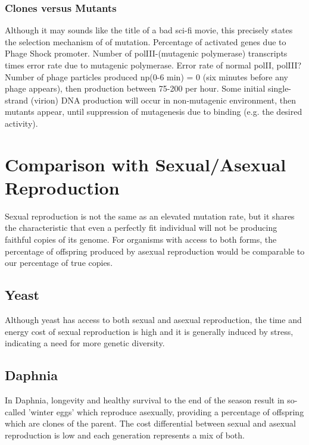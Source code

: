 \documentclass[10pt,letterpaper]{article}
\begin{document}
\subsubsection*{Clones versus Mutants}
Although it may sounds like the title of a bad sci-fi movie, this precisely states the selection mechanism of of mutation.
\newline
Percentage of activated genes due to Phage Shock promoter.
\newline
Number of polIII-(mutagenic polymerase) transcripts times error rate due to mutagenic polymerase.
\newline
Error rate of normal polII, polIII?
\newline
Number of phage particles produced np(0-6 min) = 0 (six minutes before any phage appears), then production between 75-200 per hour.
\newline
Some initial single-strand (virion) DNA production will occur in non-mutagenic environment, then mutants appear, until suppression of mutagenesis due to binding (e.g. the desired activity).

\section*{Comparison with Sexual/Asexual Reproduction}
Sexual reproduction is not the same as an elevated mutation rate, but it shares the characteristic that even a perfectly fit individual will not be producing faithful copies of its genome. For organisms with access to both forms, the percentage of offspring produced by asexual reproduction would be comparable to our percentage of true copies.
\subsection*{Yeast}
Although yeast has access to both sexual and asexual reproduction, the time and energy cost of sexual reproduction is high and it is generally induced by stress, indicating a need for more genetic diversity.
\subsection*{Daphnia} 
In Daphnia, longevity and healthy survival to the end of the season result in so-called 'winter eggs' which reproduce asexually, providing a percentage of offspring which are clones of the parent. The cost differential between sexual and asexual reproduction is low and each generation represents a mix of both.
\end{document}
